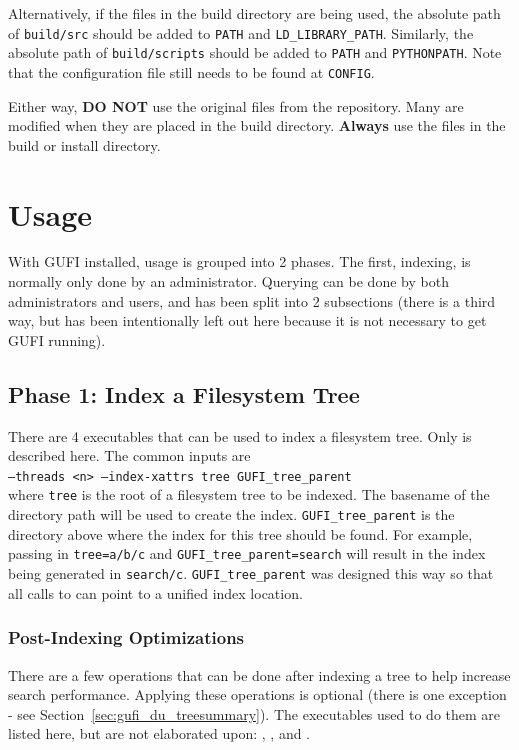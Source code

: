 Alternatively, if the files in the build directory are being used, the
absolute path of \texttt{build/src} should be added to \texttt{PATH}
and \texttt{LD\_LIBRARY\_PATH}. Similarly, the absolute path of
\texttt{build/scripts} should be added to \texttt{PATH} and
\texttt{PYTHONPATH}. Note that the configuration file still
needs to be found at \texttt{CONFIG}.

Either way, \textbf{DO NOT} use the original files from the
repository. Many are modified when they are placed in the build
directory. \textbf{Always} use the files in the build or install
directory.

\section {Usage}
\label{sec:usage}
With GUFI installed, usage is grouped into 2 phases. The first,
indexing, is normally only done by an administrator. Querying can be
done by both administrators and users, and has been split into 2
subsections (there is a third way, but has been intentionally left out
here because it is not necessary to get GUFI running).

\subsection{Phase 1: Index a Filesystem Tree}
There are 4 executables that can be used to index a filesystem
tree. Only \gufidirindex is described here. The common inputs are \\

\indent \gufidirindex \texttt{--threads <n> --index-xattrs tree GUFI\_tree\_parent} \\

where \texttt{tree} is the root of a filesystem tree to be
indexed. The basename of the directory path will be used to create the
index. \texttt{GUFI\_tree\_parent} is the directory above where the
index for this tree should be found. For example, passing in
\texttt{tree=a/b/c} and \texttt{GUFI\_tree\_parent=search} will result
in the index being generated in \texttt{search/c}. \texttt{GUFI\_tree\_parent}
was designed this way so that all calls to \gufidirindex can point to
a unified index location.

\subsubsection{Post-Indexing Optimizations}
There are a few operations that can be done after indexing a tree to
help increase search performance. Applying these operations is
optional (there is one exception - see
Section~\ref{sec:gufi_du_treesummary}). The executables used to do
them are listed here, but are not elaborated upon: \gufitreesummary,
\gufitreesummaryall, and \gufirollup.

